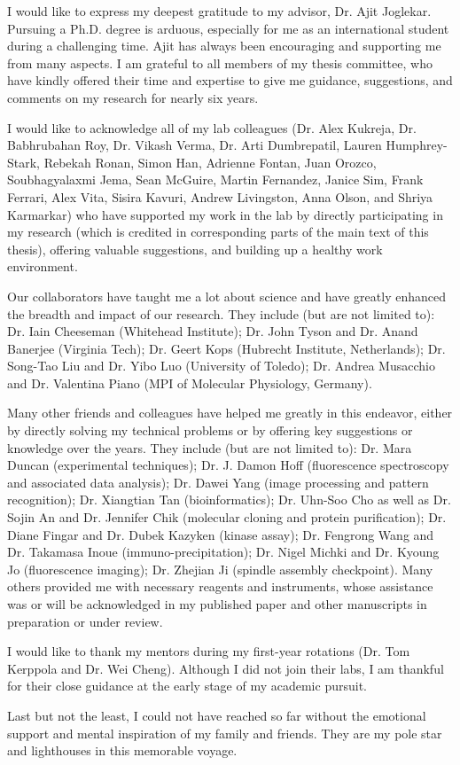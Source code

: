 I would like to express my deepest gratitude to my advisor, Dr. Ajit Joglekar. Pursuing a Ph.D. degree is arduous, especially for me as an international student during a challenging time. Ajit has always been encouraging and supporting me from many aspects. I am grateful to all members of my thesis committee, who have kindly offered their time and expertise to give me guidance, suggestions, and comments on my research for nearly six years.

I would like to acknowledge all of my lab colleagues (Dr. Alex Kukreja, Dr. Babhrubahan Roy, Dr. Vikash Verma, Dr. Arti Dumbrepatil, Lauren Humphrey-Stark, Rebekah Ronan, Simon Han, Adrienne Fontan, Juan Orozco, Soubhagyalaxmi Jema, Sean McGuire, Martin Fernandez, Janice Sim, Frank Ferrari, Alex Vita, Sisira Kavuri, Andrew Livingston, Anna Olson, and Shriya Karmarkar) who have supported my work in the lab by directly participating in my research (which is credited in corresponding parts of the main text of this thesis), offering valuable suggestions, and building up a healthy work environment.

Our collaborators have taught me a lot about science and have greatly enhanced the breadth and impact of our research. They include (but are not limited to): Dr. Iain Cheeseman (Whitehead Institute); Dr. John Tyson and Dr. Anand Banerjee (Virginia Tech); Dr. Geert Kops (Hubrecht Institute, Netherlands); Dr. Song-Tao Liu and Dr. Yibo Luo (University of Toledo); Dr. Andrea Musacchio and Dr. Valentina Piano (MPI of Molecular Physiology, Germany).

Many other friends and colleagues have helped me greatly in this endeavor, either by directly solving my technical problems or by offering key suggestions or knowledge over the years. They include (but are not limited to): Dr. Mara Duncan (experimental techniques); Dr. J. Damon Hoff (fluorescence spectroscopy and associated data analysis); Dr. Dawei Yang (image processing and pattern recognition); Dr. Xiangtian Tan (bioinformatics); Dr. Uhn-Soo Cho as well as Dr. Sojin An and Dr. Jennifer Chik (molecular cloning and protein purification); Dr. Diane Fingar and Dr. Dubek Kazyken (kinase assay); Dr. Fengrong Wang and Dr. Takamasa Inoue (immuno-precipitation); Dr. Nigel Michki and Dr. Kyoung Jo (fluorescence imaging); Dr. Zhejian Ji (spindle assembly checkpoint). Many others provided me with necessary reagents and instruments, whose assistance was or will be acknowledged in my published paper \cite{eSAC} and other manuscripts in preparation or under review.

I would like to thank my mentors during my first-year rotations (Dr. Tom Kerppola and Dr. Wei Cheng). Although I did not join their labs, I am thankful for their close guidance at the early stage of my academic pursuit.%

Last but not the least, I could not have reached so far without the emotional support and mental inspiration of my family and friends. They are my pole star and lighthouses in this memorable voyage.